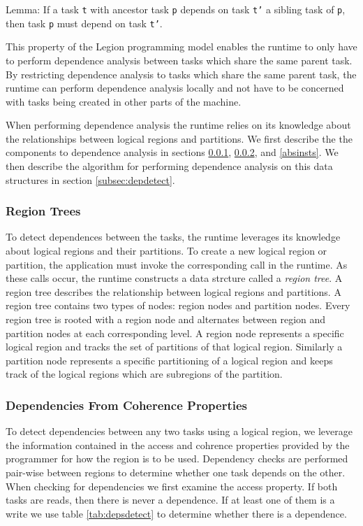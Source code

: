 Lemma: If a task {\tt t} with ancestor task {\tt p} depends on task {\tt t'}
a sibling task of {\tt p}, then task {\tt p} must depend on task {\tt t'}.

This property of the Legion programming model enables the runtime to only 
have to perform dependence analysis between tasks which share the same 
parent task.  By restricting dependence analysis to tasks which share the same
parent task, the runtime can perform dependence analysis locally and not
have to be concerned with tasks being created in other parts of the machine.

When performing dependence analysis the runtime relies on its knowledge about
the relationships between logical regions and partitions.  We first describe
the the components to dependence analysis in sections \ref{subsec:regiontree},
\ref{subsec:cohdep}, and \ref{absinsts}.  We then describe the algorithm for performing 
dependence analysis on this data structures in section \ref{subsec:depdetect}.

\subsubsection{Region Trees}
\label{subsec:regiontree}
To detect dependences between the tasks, the runtime leverages its knowledge
about logical regions and their partitions.  To create a new logical region
or partition, the application must invoke the corresponding call in the
runtime.  As these calls occur, the runtime constructs a data strcture
called a {\em region tree}.  A region tree describes the relationship between
logical regions and partitions.  A region tree contains two types of nodes:
region nodes and partition nodes.  Every region tree is rooted with a region
node and alternates between region and partition nodes at each corresponding level.
A region node represents a specific logical region and tracks the set of
partitions of that logical region.  Similarly a partition node represents 
a specific partitioning of a logical region and keeps track of the logical regions 
which are subregions of the partition.  

\subsubsection{Dependencies From Coherence Properties}
\label{subsec:cohdep}
To detect dependencies between any two tasks using a logical region, we leverage
the information contained in the access and cohrence properties provided by the programmer
for how the region is to be used.  Dependency checks are performed pair-wise between regions
to determine whether one task depends on the other.  When checking for
dependencies we first examine the access property.  If both tasks are reads, then 
there is never a dependence.  If at least one of them is a write we use table
\ref{tab:depsdetect} to determine whether there is a dependence.

